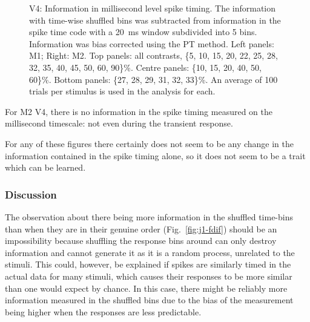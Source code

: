 \begin{figure}[htbp]
\begin{subfigure}[b]{0.5\linewidth}
    \end{subfigure}
    \caption{\ac{V4}: Information in millisecond level spike timing.
The information with time-wise shuffled bins was subtracted from information in the spike time code with a \SI{20}{ms} window subdivided into 5 bins.
Information was bias corrected using the \ac{PT} method.
Left panels: \ac{M1}; Right: \ac{M2}.
Top panels: all contrasts, \{5, 10, 15, 20, 22, 25, 28, 32, 35, 40, 45, 50, 60, 90\}\%.
Centre panels: \{10, 15, 20, 40, 50, 60\}\%.
Bottom panels: \{27, 28, 29, 31, 32, 33\}\%.
An average of 100 trials per stimulus is used in the analysis for each.
}
    \label{fig:v4-dif}
\end{figure}


For \ac{M2} \ac{V4}, there is no information in the spike timing measured on the millisecond timescale: not even during the transient response.

For any of these figures there certainly does not seem to be any change in the information contained in the spike timing alone, so it does not seem to be a trait which can be learned.



\subsubsection{Discussion}

The observation about there being more information in the shuffled time-bins than when they are in their genuine order (Fig.~\ref{fig:j1-fdif}) should be an impossibility because shuffling the response bins around can only destroy information and cannot generate it as it is a random process, unrelated to the stimuli.
This could, however, be explained if spikes are similarly timed in the actual data for many stimuli, which causes their responses to be more similar than one would expect by chance.
In this case, there might be reliably more information measured in the shuffled bins due to the bias of the measurement being higher when the responses are less predictable.

